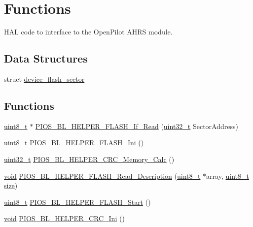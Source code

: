 \hypertarget{group___p_i_o_s___b_o_o_t_l_o_a_d_e_r}{\section{Functions}
\label{group___p_i_o_s___b_o_o_t_l_o_a_d_e_r}
}


H\-A\-L code to interface to the Open\-Pilot A\-H\-R\-S module.  


\subsection*{Data Structures}
\begin{DoxyCompactItemize}
\item 
struct \hyperlink{structdevice__flash__sector}{device\-\_\-flash\-\_\-sector}
\end{DoxyCompactItemize}
\subsection*{Functions}
\begin{DoxyCompactItemize}
\item 
\hyperlink{stdint_8h_aba7bc1797add20fe3efdf37ced1182c5}{uint8\-\_\-t} $\ast$ \hyperlink{group___p_i_o_s___b_o_o_t_l_o_a_d_e_r_ga53c23d275b9ef4d15f2cc3df97092b05}{P\-I\-O\-S\-\_\-\-B\-L\-\_\-\-H\-E\-L\-P\-E\-R\-\_\-\-F\-L\-A\-S\-H\-\_\-\-If\-\_\-\-Read} (\hyperlink{stdint_8h_a435d1572bf3f880d55459d9805097f62}{uint32\-\_\-t} Sector\-Address)
\item 
\hyperlink{stdint_8h_aba7bc1797add20fe3efdf37ced1182c5}{uint8\-\_\-t} \hyperlink{group___p_i_o_s___b_o_o_t_l_o_a_d_e_r_gac6a1eb4bf2d43b88e7731be922624df5}{P\-I\-O\-S\-\_\-\-B\-L\-\_\-\-H\-E\-L\-P\-E\-R\-\_\-\-F\-L\-A\-S\-H\-\_\-\-Ini} ()
\item 
\hyperlink{stdint_8h_a435d1572bf3f880d55459d9805097f62}{uint32\-\_\-t} \hyperlink{group___p_i_o_s___b_o_o_t_l_o_a_d_e_r_ga240c1399625e423704a60b750df9f536}{P\-I\-O\-S\-\_\-\-B\-L\-\_\-\-H\-E\-L\-P\-E\-R\-\_\-\-C\-R\-C\-\_\-\-Memory\-\_\-\-Calc} ()
\item 
\hyperlink{group___n_a_m_e_ga18028b8badbf1ea7e704ccac3c488e82}{void} \hyperlink{group___p_i_o_s___b_o_o_t_l_o_a_d_e_r_gacebd42fb8e03fb132f6970e60f79d1d6}{P\-I\-O\-S\-\_\-\-B\-L\-\_\-\-H\-E\-L\-P\-E\-R\-\_\-\-F\-L\-A\-S\-H\-\_\-\-Read\-\_\-\-Description} (\hyperlink{stdint_8h_aba7bc1797add20fe3efdf37ced1182c5}{uint8\-\_\-t} $\ast$array, \hyperlink{stdint_8h_aba7bc1797add20fe3efdf37ced1182c5}{uint8\-\_\-t} \hyperlink{pios__opahrs__proto_8h_ae5dc6ffcd9b7605c7787791e40cc6bb0}{size})
\item 
\hyperlink{stdint_8h_aba7bc1797add20fe3efdf37ced1182c5}{uint8\-\_\-t} \hyperlink{group___p_i_o_s___b_o_o_t_l_o_a_d_e_r_ga476de40b81c2052e8973faafeeee358c}{P\-I\-O\-S\-\_\-\-B\-L\-\_\-\-H\-E\-L\-P\-E\-R\-\_\-\-F\-L\-A\-S\-H\-\_\-\-Start} ()
\item 
\hyperlink{group___n_a_m_e_ga18028b8badbf1ea7e704ccac3c488e82}{void} \hyperlink{group___p_i_o_s___b_o_o_t_l_o_a_d_e_r_ga3de0744595a09bee80a7bd16dfc3a6bc}{P\-I\-O\-S\-\_\-\-B\-L\-\_\-\-H\-E\-L\-P\-E\-R\-\_\-\-C\-R\-C\-\_\-\-Ini} ()
\end{DoxyCompactItemize}
